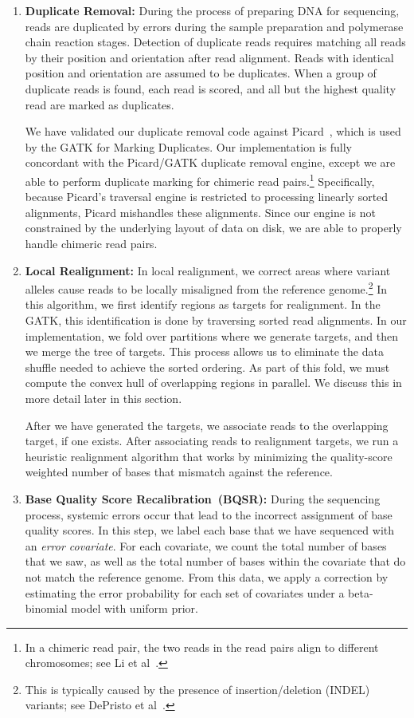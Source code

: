 \documentclass[phd]{ucbthesis}
\begin{document}
\begin{enumerate}
\item \textbf{Duplicate Removal:} During the process of preparing DNA for sequencing, reads are duplicated by
errors during the sample preparation and polymerase chain reaction stages. Detection of duplicate reads
requires matching all reads by their position and orientation after read alignment. Reads with identical position
and orientation are assumed to be duplicates. When a group of duplicate reads is found, each read is scored,
and all but the highest quality read are marked as duplicates.

We have validated our duplicate removal code against Picard~\cite{picard}, which is used by the GATK
for Marking Duplicates. Our implementation is fully concordant with the Picard/GATK duplicate removal
engine, except we are able to perform duplicate marking for chimeric read pairs.\footnote{In a chimeric read pair,
the two reads in the read pairs align to different chromosomes; see Li et al~\cite{li10}.}
Specifically, because Picard's traversal engine is restricted to processing linearly sorted alignments,
Picard mishandles these alignments. Since our engine is not constrained by the underlying layout of data
on disk, we are able to properly handle chimeric read pairs.
\item \textbf{Local Realignment:} In local realignment, we correct areas where variant alleles cause reads to be
locally misaligned from the reference genome.\footnote{This is typically caused by the presence of
insertion/deletion (INDEL) variants; see DePristo et al~\cite{depristo11}.} In this algorithm, we first identify regions
as targets for realignment. In the \textsc{GATK}, this identification is done by traversing sorted read alignments. In our implementation,
we fold over partitions where we generate targets, and then we merge the tree of targets. This process allows us
to eliminate the data shuffle needed to achieve the sorted ordering. As part of this fold, we must
compute the convex hull of overlapping regions in parallel. We discuss this in more detail later in this section.

After we have generated the targets, we associate reads to the overlapping target, if one exists. After
associating reads to realignment targets, we run a heuristic realignment algorithm that works by minimizing
the quality-score weighted number of bases that mismatch against the reference.
\item \textbf{Base Quality Score Recalibration~(BQSR):} During the sequencing process, systemic errors occur
that lead to the incorrect assignment of base quality scores. In this step, we label each base that we have
sequenced with an \emph{error covariate}. For each covariate, we count the total number of bases that we saw,
as well as the total number of bases within the covariate that do not match the reference genome. From this data, 
we apply a correction by estimating the error probability for each set of covariates under a beta-binomial model
with uniform prior.


\end{enumerate}
\end{document}

